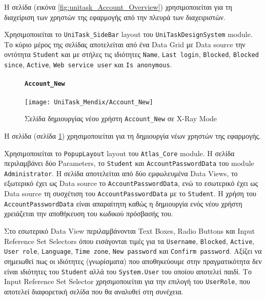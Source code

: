                     Η σελίδα (εικόνα \ref{fig:unitask_Account_Overview}) χρησιμοποιείται για τη διαχείριση των χρηστών της εφαρμογής από την πλευρά των διαχειριστών.

                    Χρησιμοποιείται το \texttt{UniTask\_SideBar} layout του \texttt{UniTaskDesignSystem} module. Το κύριο μέρος της σελίδας αποτελείται από ένα Data Grid με Data source την οντότητα \texttt{Student} και με στήλες τις ιδιότητες \texttt{Name}, \texttt{Last login}, \texttt{Blocked}, \texttt{Blocked since}, \texttt{Active}, \texttt{Web service user} και \texttt{Is anonymous}.

                \newpage

                \begin{figure}[H] \noindent
                    \paragraph{\texttt{Account\_New}}
                    \begin{center}
                        \texttt{[image: UniTask\_Mendix/Account\_New]}
                        \caption{\centering Σελίδα δημιουργίας νέου χρήστη \texttt{Account\_New} σε X-Ray Mode}
                        \label{fig:unitask_Account_New}
                    \end{center}
                \end{figure}

                    Η σελίδα (σελίδα \ref{fig:unitask_Account_New}) χρησιμοποιείται για τη δημιουργία νέων χρηστών της εφαρμογής.

                    Χρησιμοποιείται το \texttt{PopupLayout} layout του \texttt{Atlas\_Core} module. Η σελίδα περιλαμβάνει δύο Parameters, το \texttt{Student} και \texttt{AccountPasswordData} του module \linebreak \texttt{Administrator}. Η σελίδα αποτελείται από δύο εμφωλευμένα Data Views, το εξωτερικό έχει ως Data source το \texttt{AccountPasswordData}, ενώ το εσωτερικό έχει ως Data source τη συσχέτιση του \texttt{AccountPasswordData} με το \texttt{Student}. Η χρήση του \texttt{AccountPasswordData} είναι απαραίτητη καθώς η δημιουργία ενός νέου χρήστη χρειάζεται την αποθήκευση του κωδικού πρόσβασής του.

                    Στο εσωτερικό Data View περιλαμβάνονται Text Boxes, Radio Buttons και Input \linebreak Reference Set Selectors όπου εισάγονται τιμές για τα \texttt{Username}, \texttt{Blocked}, \texttt{Active}, \texttt{User role}, \texttt{Language}, \texttt{Time zone}, \texttt{New password} και \texttt{Confirm password}. Αξίζει να σημειωθεί πως οι ιδιότητες (γνωρίσματα) που αποθηκεύουμε στην πραγματικότητα δεν είναι ιδιότητες του \texttt{Student} αλλά του \texttt{System.User} του οποίου αποτελεί παιδί. Το Input Reference Set Selector χρησιμοποιείται για την επιλογή του \texttt{UserRole}, που αποτελεί διαφορετική σελίδα που θα αναλυθεί στη συνέχεια.

